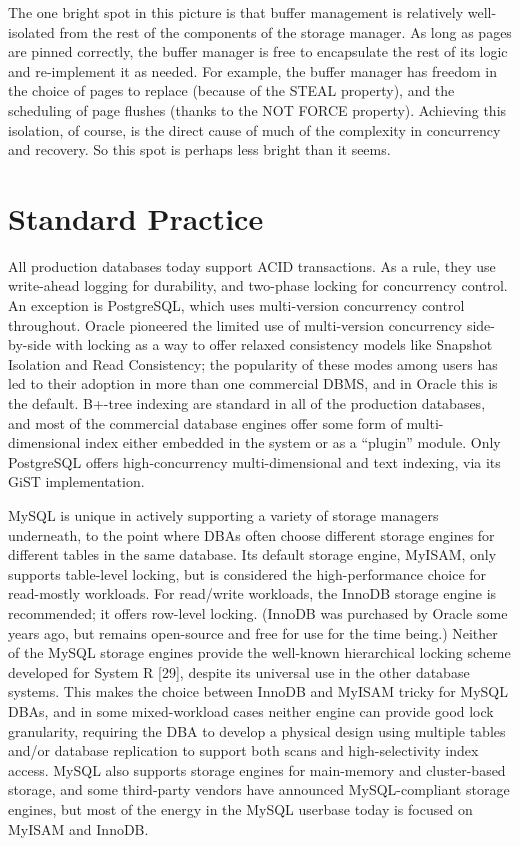 \documentclass[b5paper,11pt,twoside,openright]{book}
\begin{document}
The one bright spot in this picture is that buffer management is
relatively well-isolated from the rest of the components of the storage
manager. As long as pages are pinned correctly, the buffer manager is
free to encapsulate the rest of its logic and re-implement it as needed.
For example, the buffer manager has freedom in the choice of pages to
replace (because of the STEAL property), and the scheduling of page
flushes (thanks to the NOT FORCE property). Achieving this isolation, of
course, is the direct cause of much of the complexity in concurrency and
recovery. So this spot is perhaps less bright than it seems.

\hypertarget{standard-practice-4}{%
\section{Standard Practice}\label{standard-practice-4}}

All production databases today support ACID transactions. As a rule,
they use write-ahead logging for durability, and two-phase locking for
concurrency control. An exception is PostgreSQL, which uses
multi-version concurrency control throughout. Oracle pioneered the
limited use of multi-version concurrency side-by-side with locking as a
way to offer relaxed consistency models like Snapshot Isolation and Read
Consistency; the popularity of these modes among users has led to their
adoption in more than one commercial DBMS, and in Oracle this is the
default. B+-tree indexing are standard in all of the production
databases, and most of the commercial database engines offer some form
of multi-dimensional index either embedded in the system or as a
``plugin'' module. Only PostgreSQL offers high-concurrency
multi-dimensional and text indexing, via its GiST implementation.

MySQL is unique in actively supporting a variety of storage managers
underneath, to the point where DBAs often choose different storage
engines for different tables in the same database. Its default storage
engine, MyISAM, only supports table-level locking, but is considered the
high-performance choice for read-mostly workloads. For read/write
workloads, the InnoDB storage engine is recommended; it offers row-level
locking. (InnoDB was purchased by Oracle some years ago, but remains
open-source and free for use for the time being.) Neither of the MySQL
storage engines provide the well-known hierarchical locking scheme
developed for System R {[}29{]}, despite its universal use in the other
database systems. This makes the choice between InnoDB and MyISAM tricky
for MySQL DBAs, and in some mixed-workload cases neither engine can
provide good lock granularity, requiring the DBA to develop a physical
design using multiple tables and/or database replication to support both
scans and high-selectivity index access. MySQL also supports storage
engines for main-memory and cluster-based storage, and some third-party
vendors have announced MySQL-compliant storage engines, but most of the
energy in the MySQL userbase today is focused on MyISAM and InnoDB.
\end{document}
